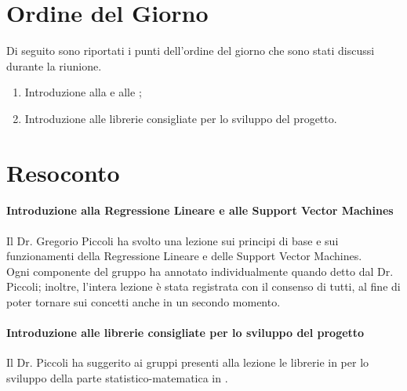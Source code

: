 \documentclass{article}
\begin{document}
\section{Ordine del Giorno}%
\label{ordine_del_giorno}
Di seguito sono riportati i punti dell'ordine del giorno che sono stati discussi durante la riunione.
\begin{enumerate}
  \item Introduzione alla  e alle ;
  \item Introduzione alle librerie consigliate per lo sviluppo del progetto.
\end{enumerate}

\section{Resoconto}%
\label{resoconto}
\paragraph*{Introduzione alla Regressione Lineare e alle Support Vector Machines}
Il Dr. Gregorio Piccoli ha svolto una lezione sui principi di base e sui funzionamenti della Regressione Lineare e delle Support Vector Machines. \\
Ogni componente del gruppo ha annotato individualmente quando detto dal Dr. Piccoli; inoltre, l'intera lezione è stata registrata con il consenso di tutti, al fine di poter tornare sui concetti anche in un secondo momento.

\paragraph*{Introduzione alle librerie consigliate per lo sviluppo del progetto}
Il Dr. Piccoli ha suggerito ai gruppi presenti alla lezione le librerie in  per lo sviluppo della parte statistico-matematica  in .
\end{document}
